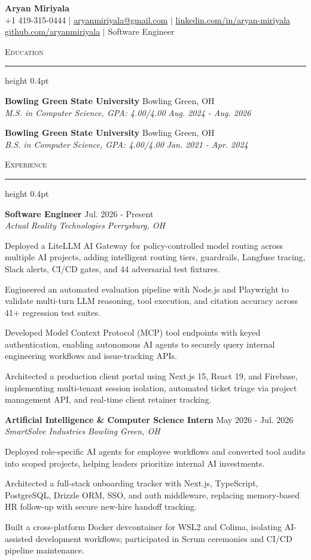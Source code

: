 \documentclass[letterpaper,11pt]{article}
\newcommand{\resumesection}[1]{%
  \par\vspace{2pt}%
  {\large\scshape #1}\par\vspace{2pt}%
  \hrule height 0.4pt\vspace{2pt}%
}
\newcommand{\resumeSubheading}[4]{
  \textbf{#1} \hfill #2\\
  \textit{#3} \hfill \textit{#4}
}
\begin{document}
\begin{center}
  {\LARGE \textbf{Aryan Miriyala}}\\[2pt]
  \small
  +1 419-315-0444 $|$ \href{mailto:aryanmiriyala@gmail.com}{aryanmiriyala@gmail.com} $|$ \href{https://www.linkedin.com/in/aryan-miriyala-7788a21b6/}{linkedin.com/in/aryan-miriyala}\\
  \href{https://github.com/aryanmiriyala}{github.com/aryanmiriyala} $|$ Software Engineer
\end{center}\vspace{-6pt}

\resumesection{Education}
\resumeSubheading
{Bowling Green State University}{Bowling Green, OH}
{M.S. in Computer Science, GPA: 4.00/4.00}{Aug. 2024 - Aug. 2026}

\resumeSubheading
{Bowling Green State University}{Bowling Green, OH}
{B.S. in Computer Science, GPA: 4.00/4.00}{Jan. 2021 - Apr. 2024}

\resumesection{Experience}
\resumeSubheading
{Software Engineer}{Jul. 2026 - Present}
{Actual Reality Technologies}{Perrysburg, OH}
\begin{tightitemize}
  \item Deployed a LiteLLM AI Gateway for policy-controlled model routing across multiple AI projects, adding intelligent routing tiers, guardrails, Langfuse tracing, Slack alerts, CI/CD gates, and 44 adversarial test fixtures.
  \item Engineered an automated evaluation pipeline with Node.js and Playwright to validate multi-turn LLM reasoning, tool execution, and citation accuracy across 41+ regression test suites.
  \item Developed Model Context Protocol (MCP) tool endpoints with keyed authentication, enabling autonomous AI agents to securely query internal engineering workflows and issue-tracking APIs.
  \item Architected a production client portal using Next.js 15, React 19, and Firebase, implementing multi-tenant session isolation, automated ticket triage via project management API, and real-time client retainer tracking.
\end{tightitemize}

\resumeSubheading
{Artificial Intelligence \& Computer Science Intern}{May 2026 - Jul. 2026}
{SmartSolve Industries}{Bowling Green, OH}
\begin{tightitemize}
  \item Deployed role-specific AI agents for employee workflows and converted tool audits into scoped projects, helping leaders prioritize internal AI investments.
  \item Architected a full-stack onboarding tracker with Next.js, TypeScript, PostgreSQL, Drizzle ORM, SSO, and auth middleware, replacing memory-based HR follow-up with secure new-hire handoff tracking.
  \item Built a cross-platform Docker devcontainer for WSL2 and Colima, isolating AI-assisted development workflows; participated in Scrum ceremonies and CI/CD pipeline maintenance.
\end{tightitemize}
\end{document}
